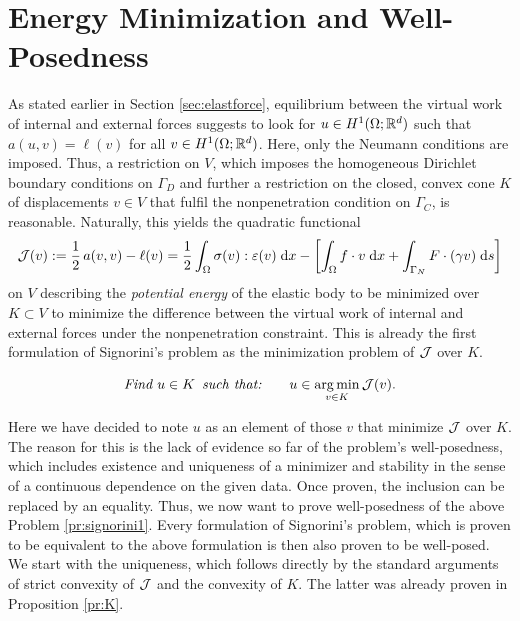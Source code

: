 \section{Energy Minimization and Well-Posedness}

As stated earlier in Section \ref{sec:elastforce}, equilibrium between the virtual work of internal and external forces suggests to look for $u\in H^1(\Omega;{\mathbb R}^d)$ such that $a(u,v) = \ell(v)$ for all $v\in H^1(\Omega;{\mathbb R}^d)$. Here, only the Neumann conditions are imposed. Thus, a restriction on $V$, which imposes the homogeneous Dirichlet boundary conditions on $\Gamma_D$ and further a restriction on the closed, convex cone $K$ of displacements $v\in V$ that fulfil the nonpenetration condition on $\Gamma_C$, is reasonable. Naturally, this yields the quadratic functional
\begin{equation}\label{eq:energyfunc}
	{\mathcal J}(v):= \frac{1}{2}\,a(v,v)-\ell(v) = \frac{1}{2}\int_\Omega \sigma(v):\varepsilon(v)\;{{\mathrm{d}} x} -\left[\int_\Omega f\cdot v\;{{\mathrm{d}} x} + \int_{\Gamma_N}F\cdot (\gamma v)\;{{\mathrm{d}} s}\right]
\end{equation}
on $V$ describing the {\em potential energy} of the elastic body to be minimized over $K\subset V$ to minimize the difference between the virtual work of internal and external forces under the nonpenetration constraint. This is already the first formulation of Signorini's problem as the minimization problem of ${\mathcal J}$ over $K$.

\begin{problem}\label{pr:signorini1}
\begin{equation*}
	\text{\em Find }u\in K\text{\em\enspace such that:}\qquad u\in \argmin_{v\in K}\cJ(v).
\end{equation*}
\end{problem}

Here we have decided to note $u$ as an element of those $v$ that minimize ${\mathcal J}$ over $K$. The reason for this is the lack of evidence so far of the problem's well-posedness, which includes existence and uniqueness of a minimizer and stability in the sense of a continuous dependence on the given data. Once proven, the inclusion can be replaced by an equality. Thus, we now want to prove well-posedness of the above Problem \ref{pr:signorini1}. Every formulation of Signorini's problem, which is proven to be equivalent to the above formulation is then also proven to be well-posed. We start with the uniqueness, which follows directly by the standard arguments of strict convexity of ${\mathcal J}$ and the convexity of $K$. The latter was already proven in Proposition \ref{pr:K}.

